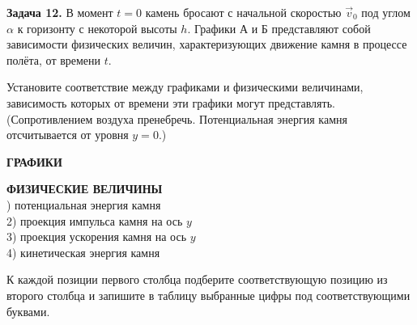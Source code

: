 \begin{taskbasic}[code={\label{task:dem26_v12_n6}}]
\textbf{Задача 12.} В момент $t=0$ камень бросают с начальной скоростью $\vec{v}_0$ под углом $\alpha$ к горизонту с некоторой высоты $h$. Графики А и Б представляют собой зависимости физических величин, характеризующих движение камня в процессе полёта, от времени $t$.

Установите соответствие между графиками и физическими величинами, зависимость которых от времени эти графики могут представлять. (Сопротивлением воздуха пренебречь. Потенциальная энергия камня отсчитывается от уровня $y=0$.)

\nopagebreak\smallskip
\begin{center}
\begin{minipage}[b]{0.45\linewidth}
\centering
\textbf{ГРАФИКИ}\\
\smallskip
{}

\vspace{0.5cm}
\end{minipage}
\begin{minipage}[b]{0.5\linewidth}
\textbf{ФИЗИЧЕСКИЕ ВЕЛИЧИНЫ}\\
) потенциальная энергия камня \\
2) проекция импульса камня на ось $y$ \\
3) проекция ускорения камня на ось $y$ \\
4) кинетическая энергия камня \\
\end{minipage}
\end{center}

К каждой позиции первого столбца подберите соответствующую позицию из второго столбца и запишите в таблицу выбранные цифры под соответствующими буквами.

\end{taskbasic}

